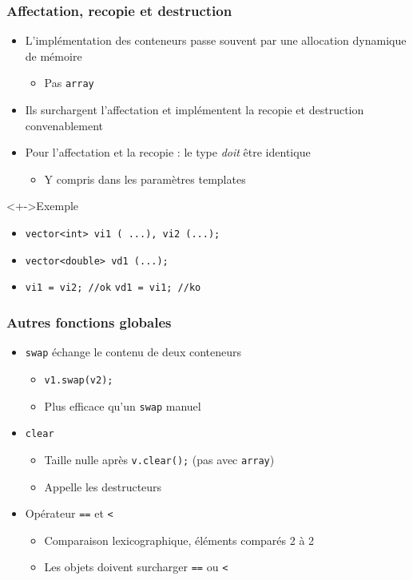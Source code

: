 \begin{frame}
\frametitle{Affectation, recopie et destruction}
\begin{itemize}[<+->]
\item L'implémentation des conteneurs passe souvent par une allocation dynamique de mémoire
	\begin{itemize}
	\item Pas \texttt{array}
	\end{itemize}
\item Ils surchargent l'affectation et implémentent la recopie et destruction convenablement
\item Pour l'affectation et la recopie : le type \emph{doit} être identique
	\begin{itemize}
	\item Y compris dans les paramètres templates
	\end{itemize}
\end{itemize}
\begin{exampleblock}<+->{Exemple}
	\begin{itemize}[<+->]
	\item \lstinline|vector<int> vi1 ( ...), vi2 (...);|
	\item \lstinline|vector<double> vd1 (...);|
	\item \lstinline|vi1 = vi2; //ok| \hspace*{0.5cm} \lstinline|vd1 = vi1; //ko|
	\end{itemize}
\end{exampleblock}
\end{frame}

\begin{frame}
\frametitle{Autres fonctions globales}
\begin{itemize}[<+->]
\item \texttt{swap} échange le contenu de deux conteneurs
	\begin{itemize}
	\item \texttt{v1.swap(v2);}
	\item Plus efficace qu'un \texttt{swap} manuel
	\end{itemize}
\item \texttt{clear}
	\begin{itemize}
	\item Taille nulle après \texttt{v.clear();} (pas avec \texttt{array})
	\item Appelle les destructeurs
	\end{itemize}
\item Opérateur \texttt{==} et \texttt{<}
	\begin{itemize}
	\item Comparaison lexicographique, éléments comparés 2 à 2
	\item Les objets doivent surcharger \texttt{==} ou \texttt{<}
	\end{itemize}
\end{itemize}
\end{frame}

